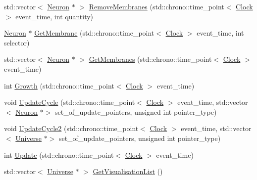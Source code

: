 \begin{DoxyCompactItemize}
\item 
std\+::vector$<$ \mbox{\hyperlink{classNeuron}{Neuron}} $\ast$ $>$ \mbox{\hyperlink{classNeuron_a3cd5fc6f1a354d99bb8768df7ee40552}{Remove\+Membranes}} (std\+::chrono\+::time\+\_\+point$<$ \mbox{\hyperlink{universe_8h_a0ef8d951d1ca5ab3cfaf7ab4c7a6fd80}{Clock}} $>$ event\+\_\+time, int quantity)
\item 
\mbox{\hyperlink{classNeuron}{Neuron}} $\ast$ \mbox{\hyperlink{classNeuron_a5bc4e67c5f2d8a3bcd160aa3f5086aec}{Get\+Membrane}} (std\+::chrono\+::time\+\_\+point$<$ \mbox{\hyperlink{universe_8h_a0ef8d951d1ca5ab3cfaf7ab4c7a6fd80}{Clock}} $>$ event\+\_\+time, int selector)
\item 
std\+::vector$<$ \mbox{\hyperlink{classNeuron}{Neuron}} $\ast$ $>$ \mbox{\hyperlink{classNeuron_ac759d9589c0505332e8238cafbc8fa66}{Get\+Membranes}} (std\+::chrono\+::time\+\_\+point$<$ \mbox{\hyperlink{universe_8h_a0ef8d951d1ca5ab3cfaf7ab4c7a6fd80}{Clock}} $>$ event\+\_\+time)
\item 
int \mbox{\hyperlink{classNeuron_a82b34717999a29e5413ebfcfa58c9356}{Growth}} (std\+::chrono\+::time\+\_\+point$<$ \mbox{\hyperlink{universe_8h_a0ef8d951d1ca5ab3cfaf7ab4c7a6fd80}{Clock}} $>$ event\+\_\+time)
\item 
void \mbox{\hyperlink{classNeuron_a06f45a5d1de890da84d3644fe58ea0a9}{Update\+Cycle}} (std\+::chrono\+::time\+\_\+point$<$ \mbox{\hyperlink{universe_8h_a0ef8d951d1ca5ab3cfaf7ab4c7a6fd80}{Clock}} $>$ event\+\_\+time, std\+::vector$<$ \mbox{\hyperlink{classNeuron}{Neuron}} $\ast$$>$ set\+\_\+of\+\_\+update\+\_\+pointers, unsigned int pointer\+\_\+type)
\item 
void \mbox{\hyperlink{classNeuron_a55c72e8066caf1ad8e25a2b0b453ee69}{Update\+Cycle2}} (std\+::chrono\+::time\+\_\+point$<$ \mbox{\hyperlink{universe_8h_a0ef8d951d1ca5ab3cfaf7ab4c7a6fd80}{Clock}} $>$ event\+\_\+time, std\+::vector$<$ \mbox{\hyperlink{classUniverse}{Universe}} $\ast$$>$ set\+\_\+of\+\_\+update\+\_\+pointers, unsigned int pointer\+\_\+type)
\item 
int \mbox{\hyperlink{classNeuron_a4d1dc3a9f30196fe2b09dfbfc0a567bb}{Update}} (std\+::chrono\+::time\+\_\+point$<$ \mbox{\hyperlink{universe_8h_a0ef8d951d1ca5ab3cfaf7ab4c7a6fd80}{Clock}} $>$ event\+\_\+time)
\item 
std\+::vector$<$ \mbox{\hyperlink{classUniverse}{Universe}} $\ast$ $>$ \mbox{\hyperlink{classNeuron_a9af31418d1232135bf5074f6a3d5dbf1}{Get\+Visualisation\+List}} ()
\end{DoxyCompactItemize}

